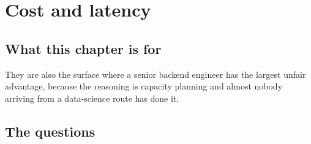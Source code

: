 \chapter{Cost and latency}
\label{ch:cost}

\section*{What this chapter is for}

 They are also the surface where a senior backend
engineer has the largest unfair advantage, because the reasoning is capacity
planning and almost nobody arriving from a data-science route has done it.

\section*{The questions}

